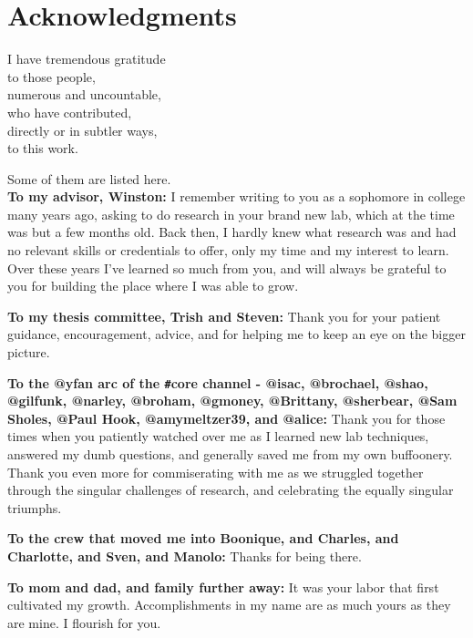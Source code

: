 \chapter*{Acknowledgments}

I have tremendous gratitude \\
to those people, \\
numerous and uncountable, \\
who have contributed, \\
directly or in subtler ways, \\
to this work.

Some of them are listed here. \\

\textbf{To my advisor, Winston:} I remember writing to you as a sophomore in college many years ago, asking to do research in your brand new lab, which at the time was but a few months old. Back then, I hardly knew what research was and had no relevant skills or credentials to offer, only my time and my interest to learn. Over these years I've learned so much from you, and will always be grateful to you for building the place where I was able to grow.

\textbf{To my thesis committee, Trish and Steven:} Thank you for your patient guidance, encouragement, advice, and for helping me to keep an eye on the bigger picture.

\textbf{To the @yfan arc of the \texttt{\#}core channel - @isac, @brochael, @shao, @gilfunk, @narley, @broham, @gmoney, @Brittany, @sherbear, @Sam Sholes, @Paul Hook, @amymeltzer39, and @alice:} Thank you for those times when you patiently watched over me as I learned new lab techniques, answered my dumb questions, and generally saved me from my own buffoonery. Thank you even more for commiserating with me as we struggled together through the singular challenges of research, and celebrating the equally singular triumphs.

\textbf{To the crew that moved me into Boonique, and Charles, and Charlotte, and Sven, and Manolo:} Thanks for being there.

\textbf{To mom and dad, and family further away:} It was your labor that first cultivated my growth. Accomplishments in my name are as much yours as they are mine. I flourish for you.
